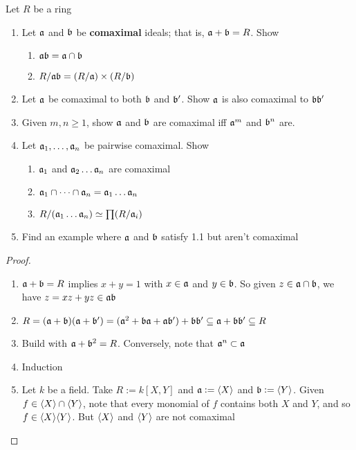 \documentclass[11pt]{article}
\begin{document}
\begin{exercise}
\label{ex1.21}
Let \(R\) be a ring
\begin{enumerate}
\item Let \(\mathfrak{a}\) and \(\mathfrak{b}\) be \textbf{comaximal} ideals; that is, \(\mathfrak{a}+\mathfrak{b}=R\). Show
\begin{enumerate}
\item \(\mathfrak{a}\mathfrak{b}=\mathfrak{a}\cap\mathfrak{b}\)
\item \(R/\mathfrak{a}\mathfrak{b}=(R/\mathfrak{a})\times(R/\mathfrak{b})\)
\end{enumerate}
\item Let \(\mathfrak{a}\) be comaximal to both \(\mathfrak{b}\) and \(\mathfrak{b}'\). Show \(\mathfrak{a}\) is
also comaximal to \(\mathfrak{b}\mathfrak{b}'\)
\item Given \(m,n\ge1\), show \(\mathfrak{a}\) and \(\mathfrak{b}\) are comaximal iff \(\mathfrak{a}^m\)
and \(\mathfrak{b}^n\) are.
\item Let \(\mathfrak{a}_1,\dots,\mathfrak{a}_n\) be pairwise comaximal. Show
\begin{enumerate}
\item \(\mathfrak{a}_1\) and \(\mathfrak{a}_2\dots\mathfrak{a}_n\) are comaximal
\item \(\mathfrak{a}_1\cap\dots\cap\mathfrak{a}_n=\mathfrak{a}_1\dots\mathfrak{a}_n\)
\item \(R/(\mathfrak{a}_1\dots\mathfrak{a}_n)\simeq\prod(R/\mathfrak{a}_i)\)
\end{enumerate}
\item Find an example where \(\mathfrak{a}\) and \(\mathfrak{b}\) satisfy 1.1 but aren't comaximal
\end{enumerate}
\end{exercise}

\begin{proof}
\begin{enumerate}
\item \(\mathfrak{a}+\mathfrak{b}=R\) implies \(x+y=1\) with \(x\in\mathfrak{a}\) and \(y\in\mathfrak{b}\). So given
\(z\in\mathfrak{a}\cap\mathfrak{b}\), we have \(z=xz+yz\in\mathfrak{a}\mathfrak{b}\)
\item \(R=(\mathfrak{a}+\mathfrak{b})(\mathfrak{a}+\mathfrak{b}')=(\mathfrak{a}^2+\mathfrak{b}\mathfrak{a}+\mathfrak{a}\mathfrak{b}')+\mathfrak{b}\mathfrak{b}'\subseteq\mathfrak{a}+\mathfrak{b}\mathfrak{b}'\subseteq
      R\)
\item Build with \(\mathfrak{a}+\mathfrak{b}^2=R\). Conversely, note that \(\mathfrak{a}^n\subset\mathfrak{a}\)
\item Induction
\item Let \(k\) be a field. Take \(R:=k[X,Y]\) and \(\mathfrak{a}:=\langle X\rangle\) and
\(\mathfrak{b}:=\langle Y\rangle\). Given \(f\in\langle X\rangle\cap\langle Y\rangle\), note that every
monomial of \(f\) contains both \(X\) and \(Y\), and so \(f\in\langle X\rangle\langle
      Y\rangle\). But \(\langle X\rangle\) and \(\langle Y\rangle\) are not comaximal
\end{enumerate}
\end{proof}
\end{document}
